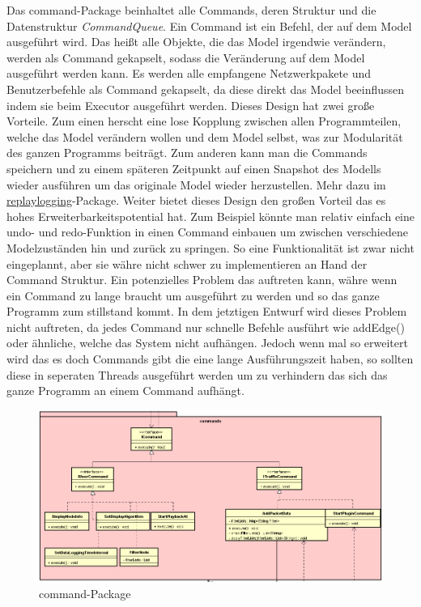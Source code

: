 Das command-Package beinhaltet alle Commands, deren Struktur und die Datenstruktur
\textit{CommandQueue}. Ein Command ist ein Befehl, der auf
dem Model ausgeführt wird. Das heißt alle Objekte, die das Model irgendwie verändern,
werden als Command gekapselt, sodass die Veränderung auf dem Model
ausgeführt werden kann. Es werden alle empfangene Netzwerkpakete
und Benutzerbefehle als Command gekapselt, da diese direkt das Model beeinflussen
indem sie beim Executor ausgeführt werden.
\newline
\newline
Dieses Design hat zwei große Vorteile. Zum einen herscht eine lose Kopplung zwischen
allen Programmteilen, welche das Model verändern wollen und dem Model selbst, was zur Modularität des ganzen
Programms beiträgt. Zum anderen kann man die Commands speichern und zu einem
späteren Zeitpunkt auf einen Snapshot des Modells wieder ausführen um das originale
Model wieder herzustellen. Mehr dazu im
\hyperref[subsubsec:replaylogging]{replaylogging}-Package. Weiter bietet dieses
Design den großen Vorteil das es hohes Erweiterbarkeitspotential hat. Zum Beispiel
könnte man relativ einfach eine undo- und redo-Funktion in einen Command einbauen um
zwischen verschiedene Modelzuständen hin und zurück zu springen. So eine
Funktionalität ist zwar nicht eingeplannt, aber sie währe nicht schwer zu implementieren
an Hand der Command Struktur.
\newline
\newline
Ein potenzielles Problem das auftreten kann, währe wenn ein Command zu lange braucht um
ausgeführt zu werden und so das ganze Programm zum stillstand kommt.
In dem jetztigen Entwurf wird dieses Problem nicht auftreten, da jedes Command
nur schnelle Befehle ausführt wie addEdge() oder ähnliche, welche das System nicht
aufhängen. Jedoch wenn \programname mal so erweitert wird das es doch Commands gibt
die eine lange Ausführungszeit haben, so sollten diese in seperaten Threads
ausgeführt werden um zu verhindern das sich das ganze Programm an einem Command
aufhängt.

\begin{figure}[H]
  \centering
  \includegraphics[width=\textwidth]{../diagramimages/commands.png}
  \caption{command-Package}
\end{figure}


